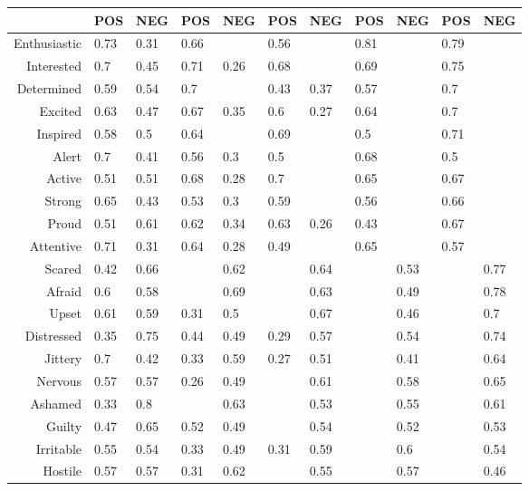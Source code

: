 \begin{table}[ht]
\centering
\begin{tabular}{rllllllllll}
  \hline
 & POS & NEG & POS & NEG & POS & NEG & POS & NEG & POS & NEG \\ 
  \hline
Enthusiastic & 0.73 & 0.31 & 0.66 &  & 0.56 &  & 0.81 &  & 0.79 &  \\ 
  Interested & 0.7 & 0.45 & 0.71 & 0.26 & 0.68 &  & 0.69 &  & 0.75 &  \\ 
  Determined & 0.59 & 0.54 & 0.7 &  & 0.43 & 0.37 & 0.57 &  & 0.7 &  \\ 
  Excited & 0.63 & 0.47 & 0.67 & 0.35 & 0.6 & 0.27 & 0.64 &  & 0.7 &  \\ 
  Inspired & 0.58 & 0.5 & 0.64 &  & 0.69 &  & 0.5 &  & 0.71 &  \\ 
  Alert & 0.7 & 0.41 & 0.56 & 0.3 & 0.5 &  & 0.68 &  & 0.5 &  \\ 
  Active & 0.51 & 0.51 & 0.68 & 0.28 & 0.7 &  & 0.65 &  & 0.67 &  \\ 
  Strong & 0.65 & 0.43 & 0.53 & 0.3 & 0.59 &  & 0.56 &  & 0.66 &  \\ 
  Proud & 0.51 & 0.61 & 0.62 & 0.34 & 0.63 & 0.26 & 0.43 &  & 0.67 &  \\ 
  Attentive & 0.71 & 0.31 & 0.64 & 0.28 & 0.49 &  & 0.65 &  & 0.57 &  \\ 
  Scared & 0.42 & 0.66 &  & 0.62 &  & 0.64 &  & 0.53 &  & 0.77 \\ 
  Afraid & 0.6 & 0.58 &  & 0.69 &  & 0.63 &  & 0.49 &  & 0.78 \\ 
  Upset & 0.61 & 0.59 & 0.31 & 0.5 &  & 0.67 &  & 0.46 &  & 0.7 \\ 
  Distressed & 0.35 & 0.75 & 0.44 & 0.49 & 0.29 & 0.57 &  & 0.54 &  & 0.74 \\ 
  Jittery & 0.7 & 0.42 & 0.33 & 0.59 & 0.27 & 0.51 &  & 0.41 &  & 0.64 \\ 
  Nervous & 0.57 & 0.57 & 0.26 & 0.49 &  & 0.61 &  & 0.58 &  & 0.65 \\ 
  Ashamed & 0.33 & 0.8 &  & 0.63 &  & 0.53 &  & 0.55 &  & 0.61 \\ 
  Guilty & 0.47 & 0.65 & 0.52 & 0.49 &  & 0.54 &  & 0.52 &  & 0.53 \\ 
  Irritable & 0.55 & 0.54 & 0.33 & 0.49 & 0.31 & 0.59 &  & 0.6 &  & 0.54 \\ 
  Hostile & 0.57 & 0.57 & 0.31 & 0.62 &  & 0.55 &  & 0.57 &  & 0.46 \\ 
   \hline
\end{tabular}
\end{table}
